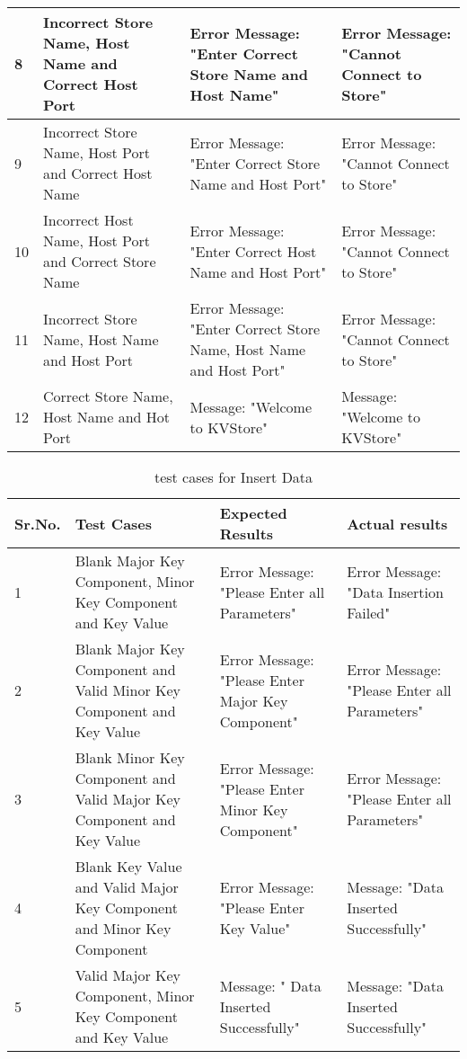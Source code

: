 \begin{table}[h]
\begin{flushleft}
\begin{tabular}{|p{1cm}|p{4cm}|p{4cm}|p{5cm}|}
8 & Incorrect Store Name, Host Name and Correct Host Port & Error Message: "Enter Correct Store Name and Host Name" & Error Message: "Cannot Connect to Store"\\	 \hline
9 & Incorrect Store Name, Host Port and Correct Host Name & Error Message: "Enter Correct Store Name and Host Port" & Error Message: "Cannot Connect to Store"\\	 \hline
10 & Incorrect Host Name, Host Port and Correct Store Name & Error Message: "Enter Correct Host Name and Host Port" &Error Message: "Cannot Connect to Store" \\	 \hline
11 & Incorrect Store Name, Host Name and Host Port & Error Message: "Enter Correct Store Name, Host Name and Host Port" & Error Message: "Cannot Connect to Store"\\	 \hline
12 & Correct Store Name, Host Name and Hot Port & Message: "Welcome to KVStore" & Message: "Welcome to KVStore"\\	 \hline
\end{tabular}
\end{flushleft}
\end{table}


\begin{table}[h]
\begin{flushleft}
\caption{test cases for Insert Data}\label{test cases for Insert Data}
\begin{tabular}{|p{1cm}|p{4cm}|p{4cm}|p{5cm}|} \hline
Sr.No. & Test Cases & Expected Results & Actual results \\ \hline
1 & Blank Major Key Component, Minor Key Component and Key Value & Error Message: "Please Enter all Parameters" & Error Message: "Data Insertion Failed"\\	 \hline
2 & Blank Major Key Component and Valid Minor Key Component and Key Value & Error Message: "Please Enter Major Key Component" & Error Message: "Please Enter all Parameters"\\	 \hline
3 & Blank Minor Key Component and Valid Major Key Component and Key Value & Error Message: "Please Enter Minor Key Component" & Error Message: "Please Enter all Parameters"\\	 \hline
4 & Blank Key Value and Valid Major Key Component and Minor Key Component & Error Message: "Please Enter Key Value" & Message: "Data Inserted Successfully"\\	 \hline
5 & Valid Major Key Component, Minor Key Component and Key Value & Message: " Data Inserted Successfully" & Message: "Data Inserted Successfully"\\	 \hline
 \end{tabular}
\end{flushleft}
\end{table}

